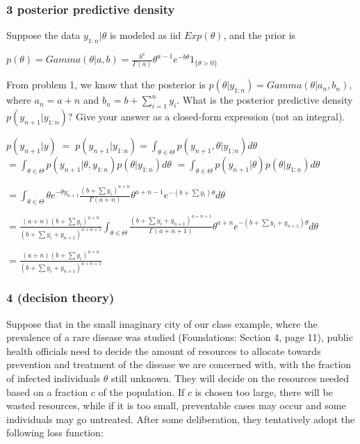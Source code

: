 \documentclass[]{article}
\begin{document}
\hypertarget{posterior-predictive-density}{%
\subsubsection{3 posterior predictive
density}\label{posterior-predictive-density}}

Suppose the data \(y_{1:n}|\theta\) is modeled as iid \(Exp(\theta)\),
and the prior is

\(p(\theta) = Gamma(\theta|a,b) = \frac{b^a}{\Gamma(a)} \theta^{a-1}e^{-b\theta}1_{\{\theta>0\}}\)

From problem 1, we know that the posterior is
\(p(\theta|y_{1:n}) = Gamma(\theta|a_n,b_n)\), where \(a_n=a+n\) and
\(b_n=b+\sum^n_{i=1} y_i\). What is the posterior predictive density
\(p(y_{n+1}|y_{1:n})\)? Give your answer as a closed-form expression
(not an integral).

\(p(y_{n+1}| y)\;=\; p(y_{n+1}| y_{1:n})=\int_{\theta\in\Theta} p(y_{n+1},\theta | y_{1:n}) d\theta\)
\(= \int_{\theta\in\Theta} p(y_{n+1} | \theta, y_{1:n}) p(\theta | y_{1:n}) d\theta\)
\(= \int_{\theta\in\Theta} p(y_{n+1} | \theta) p(\theta | y_{1:n}) d\theta\)

\(= \int_{\theta\in\Theta} \theta e^{-\theta y_{n+1}} \frac{(b+\sum y_i)^{a+n}}{\Gamma(a+n)}\theta^{a+n-1}e^{-(b+\sum y_i)\theta} d\theta\)

\(= \frac{(a+n)(b+\sum y_i)^{a+n}}{(b+\sum y_i+y_{n+1})^{a+n+1}} \int_{\theta\in\Theta} \frac{(b+\sum y_i+y_{n+1})^{a+n+1}}{\Gamma(a+n+1)}\theta^{a+n}e^{-(b+\sum y_i+y_{n+1})\theta}d\theta\)

\(= \frac{(a+n)(b+\sum y_i)^{a+n}}{(b+\sum y_i+y_{n+1})^{a+n+1}}\)

\hypertarget{decision-theory}{%
\subsubsection{4 (decision theory)}\label{decision-theory}}

Suppose that in the small imaginary city of our class example, where the
prevalence of a rare disease was studied (Foundations: Section 4, page
11), public health officials need to decide the amount of resources to
allocate towards prevention and treatment of the disease we are
concerned with, with the fraction of infected individuals \(\theta\)
still unknown. They will decide on the resources needed based on a
fraction \(c\) of the population. If \(c\) is chosen too large, there
will be wasted resources, while if it is too small, preventable cases
may occur and some individuals may go untreated. After some
deliberation, they tentatively adopt the following loss function:
\end{document}
